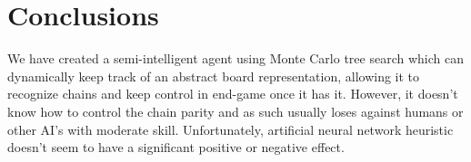 \section{Conclusions}

We have created a semi-intelligent agent using Monte Carlo tree search which can dynamically keep track of an abstract board representation, allowing it to recognize chains and keep control in end-game once it has it. However, it doesn't know how to control the chain parity and as such usually loses against humans or other AI's with moderate skill. Unfortunately, artificial neural network heuristic doesn't seem to have a significant positive or negative effect.